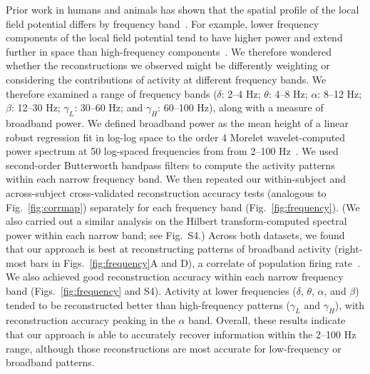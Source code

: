 \documentclass[11pt]{article}
\newcommand{\freqpower}{S4}
\begin{document}
Prior work in humans and animals has shown that the spatial profile of the local
field potential differs by frequency band~\citep[e.g., with respect to volume
conductance properties and contribution to the local field
potential;][]{BuzsEtal12, FrieEtal07, CronEtal11}.  For example, lower frequency
components of the local field potential tend to have higher power and extend
further in space than high-frequency components~\citep[e.g., ][]{MillEtal07,
MannEtal09}.  We therefore wondered whether the reconstructions we observed
might be differently weighting or considering the contributions of activity at
different frequency bands.  We therefore examined a range of frequency bands
($\delta$: 2--4 Hz; $\theta$: 4--8 Hz; $\alpha$: 8--12 Hz; $\beta$: 12--30 Hz;
$\gamma_L$: 30--60 Hz; and $\gamma_H$: 60--100 Hz), along with a measure of
broadband power.  We defined broadband power as the mean height of a linear
robust regression fit in log-log space to the order 4 Morelet wavelet-computed
power spectrum at 50 log-spaced frequencies from from 2--100
Hz~\citep{MannEtal09}. We used second-order Butterworth bandpass filters to
compute the activity patterns within each narrow frequency band.  We then
repeated our within-subject and across-subject cross-validated reconstruction
accuracy tests (analogous to Fig.~\ref{fig:corrmap}) separately for each
frequency band (Fig.~\ref{fig:frequency}).  (We also carried out a similar
analysis on the Hilbert transform-computed spectral power within each narrow
band; see Fig.~\freqpower.)  Across both datasets, we found that our approach is
best at reconstructing patterns of broadband activity (right-most bars in
Figs.~\ref{fig:frequency}A and D), a correlate of population firing
rate~\citep{MannEtal09}.  We also achieved good reconstruction accuracy within
each narrow frequency band (Figs.~\ref{fig:frequency} and \freqpower).  Activity
at lower frequencies ($\delta$, $\theta$, $\alpha$, and $\beta$) tended to be
reconstructed better than high-frequency patterns ($\gamma_L$ and $\gamma_H$),
with reconstruction accuracy peaking in the $\alpha$ band.  Overall, these
results indicate that our approach is able to accurately recover information
within the 2--100 Hz range, although those reconstructions are most accurate for
low-frequency or broadband patterns.
\end{document}
